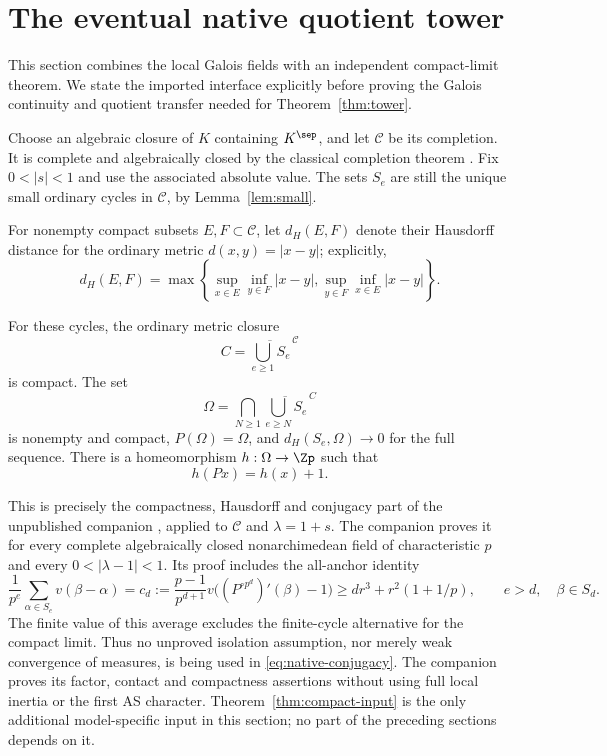 \section{The eventual native quotient tower}\label{sec:tower}

This section combines the local Galois fields with an independent
compact-limit theorem. We state the imported interface explicitly
before proving the Galois continuity and quotient transfer needed
for Theorem~\ref{thm:tower}.

Choose an algebraic closure of \(K\) containing \(K^\sep\), and let
\(\mathcal C\) be its completion. It is complete and algebraically
closed by the classical completion theorem
\cite[Theorem 1.1]{conradcompletion}. Fix \(0<|s|<1\) and use the
associated absolute value. The sets \(S_e\) are still the unique
small ordinary cycles in \(\mathcal C\), by Lemma~\ref{lem:small}.

For nonempty compact subsets \(E,F\subset\mathcal C\), let \(d_H(E,F)\)
denote their Hausdorff distance for the ordinary metric
\(d(x,y)=|x-y|\); explicitly,
\[
 d_H(E,F)=\max\left\{
 \sup_{x\in E}\inf_{y\in F}|x-y|,
 \sup_{y\in F}\inf_{x\in E}|x-y|
 \right\}.
\]

\begin{theorem}\label{thm:compact-input}
For these cycles, the ordinary metric closure
\[
 C=\overline{\bigcup_{e\ge1}S_e}^{\,\mathcal C}
\]
is compact. The set
\begin{equation}\label{eq:tail-limit}
 \Omega=\bigcap_{N\ge1}
 \overline{\bigcup_{e\ge N}S_e}^{\,C}
\end{equation}
is nonempty and compact, \(P(\Omega)=\Omega\), and
\(d_H(S_e,\Omega)\to0\) for the full sequence.
There is a homeomorphism \(h:\Omega\to\Zp\) such that
\begin{equation}\label{eq:native-conjugacy}
 h(Px)=h(x)+1.
\end{equation}
\end{theorem}

This is precisely the compactness, Hausdorff and conjugacy
part of the unpublished companion
\cite[Theorem 1.1, \emph{Compact adding-machine limit of the optimal
cycles}]{companion2026haar}, applied to \(\mathcal C\) and
\(\lambda=1+s\). The companion proves it for every complete
algebraically closed nonarchimedean field of characteristic \(p\)
and every \(0<|\lambda-1|<1\).
Its proof includes the all-anchor identity
\[
 \frac1{p^e}\sum_{\alpha\in S_e}v(\beta-\alpha)
 =c_d:=\frac{p-1}{p^{d+1}}
 v\bigl((P^{\circ p^d})'(\beta)-1\bigr)
 \ge d r^3+r^2(1+1/p),\qquad e>d,\quad\beta\in S_d.
\]
The finite value of this average excludes the finite-cycle
alternative for the compact limit. Thus no unproved isolation
assumption, nor merely weak convergence of measures, is being
used in \eqref{eq:native-conjugacy}. The companion proves its
factor, contact and compactness assertions without using full
local inertia or the first AS character.
Theorem~\ref{thm:compact-input} is the only additional
model-specific input in this section; no part of the preceding
sections depends on it.

